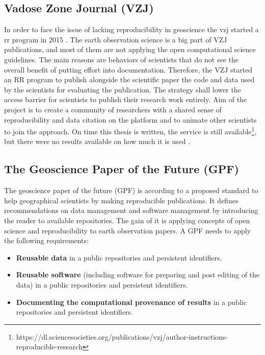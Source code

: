 \documentclass[draft,final]{vutinfth} %
\begin{document}
\subsection{Vadose Zone Journal (VZJ)}\label{VZJ}
In order to face the issue of lacking reproducibility in geoscience the \gls{vzj} started a \gls{rr} program in 2015 \cite{doi:10.2136/vzj2015.06.0088}. 
The earth observation science is a big part of VZJ publications, and most of them are not applying the open computational science guidelines. The main reasons are behaviors of scientists that do not see the overall benefit of putting effort into documentation. Therefore, the VZJ started an RR program to publish alongside the scientific paper the code and data used by the scientists for evaluating the publication. The strategy shall lower the access barrier for scientists to publish their research work entirely. Aim of the project is to create a community of researchers with a shared sense of reproducibility and data citation on the platform and to animate other scientists to join the approach. On time this thesis is written, the service is still available\footnote{https://dl.sciencesocieties.org/publications/vzj/author-instructions-reproducible-research}, but there were no results available on how much it is used \cite{doi:10.2136/vzj2015.06.0088}.

\subsection{The Geoscience Paper of the Future (GPF)}\label{GPF}

The geoscience paper of the future (GPF) is according to \cite{Gil2016TowardTG} a proposed standard to help geographical scientists by making reproducible publications. It defines recommendations on data management and software management by introducing the reader to available repositories. The gain of it is applying concepts of open science and reproducibility to earth observation papers. A GPF needs to apply the following requirements:

\begin{itemize}
	\item \textbf{Reusable data} in a public repositories and persistent identifiers.
	\item \textbf{Reusable software} (including software for preparing and post editing of the data) in a  public repositories and persistent identifiers.
	\item \textbf{Documenting the computational provenance of results} in a public repositories and persistent identifiers.  
\end{itemize}
\end{document}
